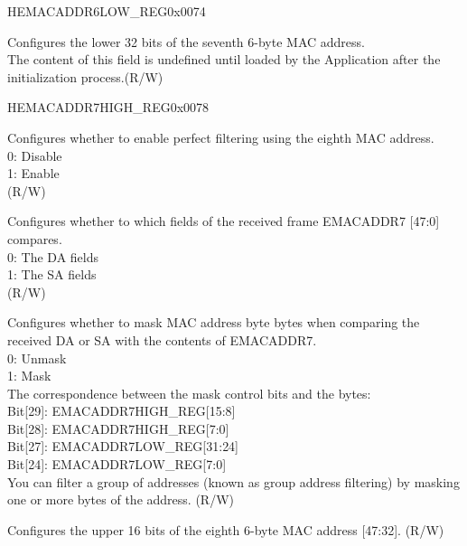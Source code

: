 \begin{register}{H}{EMACADDR6LOW\_REG}{0x0074}\label{regdesc:EMACADDR6LOWREG}
%
\regnewline%
\begin{regdesc}\begin{reglist}
\item [EMACADDR6LOW\_REG] Configures the lower 32 bits of the seventh 6-byte MAC address.\\The content of this field is undefined until loaded by the Application after the initialization process.(R/W)
\end{reglist}\end{regdesc}
\end{register}


\begin{register}{H}{EMACADDR7HIGH\_REG}{0x0078}\label{regdesc:EMACADDR7HIGHREG}
%
%
%
%
%
\regnewline%
\begin{regdesc}\begin{reglist}
\item [ADDRESS\_ENABLE7] Configures whether to enable perfect filtering using the eighth MAC address.\\
0: Disable\\
1: Enable\\ (R/W)
\item [SOURCE\_ADDRESS7] Configures whether to which fields of the received frame EMACADDR7 [47:0] compares.\\
0: The DA fields\\
1: The SA fields\\ (R/W)
\item [MASK\_BYTE\_CONTROL7] Configures whether to mask MAC address byte bytes when comparing the received DA or SA with the contents of EMACADDR7.\\
0: Unmask\\
1: Mask\\
The correspondence between the mask control bits and the bytes:\\
Bit[29]: EMACADDR7HIGH\_REG[15:8]\\
Bit[28]: EMACADDR7HIGH\_REG[7:0]\\
Bit[27]: EMACADDR7LOW\_REG[31:24]\\
Bit[24]: EMACADDR7LOW\_REG[7:0]\\
You can filter a group of addresses (known as group address filtering) by masking one or more bytes of the address. (R/W)
\item [MAC\_ADDRESS7\_HI] Configures the upper 16 bits of the eighth 6-byte MAC address [47:32]. (R/W)
\end{reglist}\end{regdesc}
\end{register}

